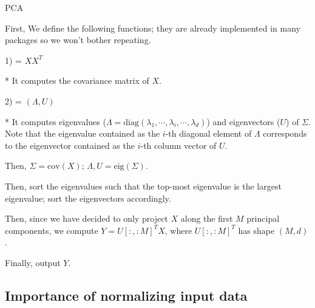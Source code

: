\documentclass{article}
\begin{document}
\vspace{3mm}
\begin{algorithm}[H]
	\DontPrintSemicolon
	
	\caption{PCA}
	
	\vspace{1mm}
	
	
	\vspace{1mm}
	First, We define the following functions; they are already implemented in many packages so we won't bother repeating.
	
	\vspace{1mm}
    1)  = $XX^T$ 
    
    \vspace{1mm}
    * It computes the covariance matrix of $X$.
	
	\vspace{1mm}
	2) \eig{$\Sigma$} = $(\Lambda, U)$ 
	
	\vspace{1mm}
	* It computes eigenvalues ($\Lambda = \text{diag}(\lambda_1, \cdots, \lambda_i, \cdots, \lambda_d)$) and eigenvectors ($U$) of $\Sigma$. Note that the eigenvalue contained as the $i$-th diagonal element of $\Lambda$ corresponds to the eigenvector contained as the $i$-th column vector of $U$.
	
	\vspace{1mm}
	Then, $\Sigma = \text{cov}(X)$; $\Lambda, U = \text{eig}(\Sigma)$.
		
	\vspace{1mm}
	Then, sort the eigenvalues such that the top-most eigenvalue is the largest eigenvalue; sort the eigenvectors accordingly.
	
	\vspace{1mm}
	Then, since we have decided to only project $X$ along the first $M$ principal components, we compute $Y = U[:, {:}M]^T X$, where $U[:, {:}M]^T$ has shape $(M, d)$.
    
    \vspace{1mm}
	Finally, output $Y$.
	
	\vspace{1mm}
\end{algorithm}


\subsection{Importance of normalizing input data}
\end{document}
